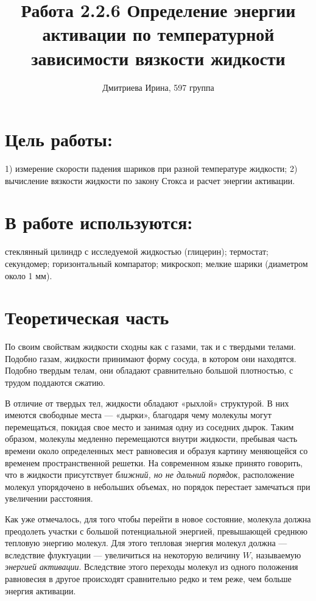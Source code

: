 \documentclass[a4paper]{article}
\title{Работа 2.2.6 Определение энергии активации
	по температурной зависимости вязкости жидкости}
\author{Дмитриева Ирина, 597 группа}
\date{}
\begin{document}
\maketitle
	
	
	\section{Цель работы:}
	1) измерение скорости падения шариков при разной температуре жидкости; 2) вычисление вязкости жидкости по закону Стокса и расчет энергии активации.
	
	\section{В работе используются:}
	стеклянный цилиндр с исследуемой жидкостью (глицерин); термостат; секундомер; горизонтальный компаратор; микроскоп; мелкие шарики (диаметром около 1 мм).
	
	\section{Теоретическая часть}
	По своим свойствам жидкости сходны как с газами, так и с твердыми телами. Подобно газам, жидкости принимают форму сосуда, в котором они находятся. Подобно твердым телам, они обладают сравнительно большой плотностью, с трудом поддаются сжатию.
	
	В отличие от твердых тел, жидкости обладают «рыхлой» структурой. В них имеются свободные места — «дырки», благодаря чему молекулы могут перемещаться, покидая свое место и занимая одну из соседних дырок. Таким образом, молекулы медленно перемещаются внутри жидкости, пребывая часть времени около определенных мест равновесия и образуя картину меняющейся со временем пространственной решетки. На современном языке принято говорить, что в жидкости присутствует \textit{ближний, но не дальний порядок}, расположение молекул упорядочено в небольших объемах, но порядок перестает замечаться при увеличении расстояния.
	
	Как уже отмечалось, для того чтобы перейти в новое состояние, молекула должна преодолеть участки с большой потенциальной энергией, превышающей среднюю тепловую энергию молекул. Для этого тепловая энергия молекул должна — вследствие флуктуации — увеличиться на некоторую величину $W$, называемую \textit{энергией активации}. Вследствие этого переходы молекул из одного положения равновесия в другое происходят сравнительно редко и тем реже, чем больше энергия активации.
	
\end{document}
